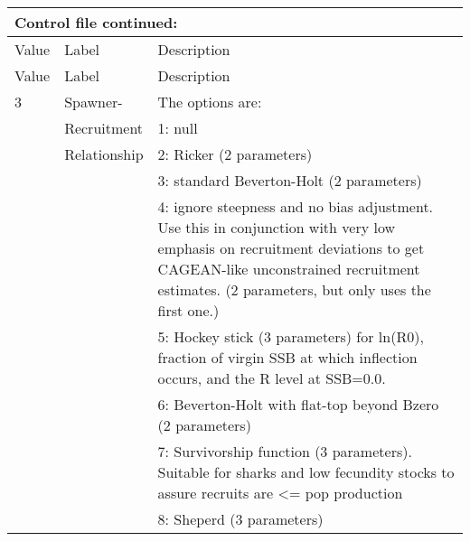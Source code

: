 \begin{center}
	\begin{longtable}{p{1cm} p{3cm} p{11cm}}
		\multicolumn{3}{l}{Control file continued:}\\
		\hline
		Value & Label &  Description\\
		\hline
		\endfirsthead

		\hline
		Value & Label &  Description\\
		\hline
		\endhead

		\endfoot
		\endlastfoot

		3 & Spawner-            & The options are: \\
		  & Recruitment         & 1: null \\
		  & Relationship        & 2:  Ricker (2 parameters) \\
		  &                     & 3:  standard Beverton-Holt (2 parameters) \\
		  &                     & 4:  ignore steepness and no bias adjustment.  Use this in conjunction with very low emphasis on recruitment deviations to get CAGEAN-like unconstrained recruitment estimates. (2 parameters, but only uses the first one.)\\
		  &                     & 5:  Hockey stick (3 parameters) for ln(R0), fraction of virgin SSB at which inflection occurs, and the R level at SSB=0.0.\\
		  &                     & 6:  Beverton-Holt with flat-top beyond Bzero (2 parameters)\\
		  &                     & 7:  Survivorship function (3 parameters).  Suitable for sharks and low fecundity stocks to assure recruits are <= pop production \\
	      &                     & 8:  Sheperd (3 parameters)\\
	\end{longtable}
\end{center}

